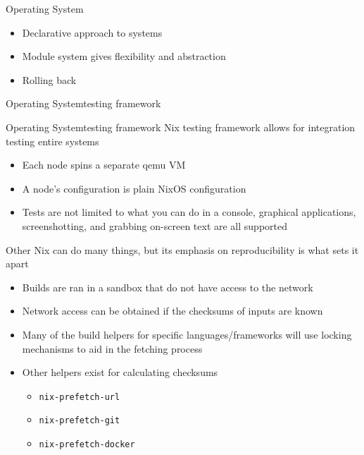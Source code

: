 \documentclass{beamer}
\begin{document}
\begin{frame}{Operating System}
	\begin{itemize}
		\item Declarative approach to systems
		\item Module system gives flexibility and abstraction
		\item Rolling back
	\end{itemize}
	
\end{frame}

\begin{frame}{Operating System}{testing framework}
	
\end{frame}

\begin{frame}{Operating System}{testing framework}
	Nix testing framework allows for integration testing entire systems
	\begin{itemize}
		\item Each node spins a separate qemu VM
		\item A node's configuration is plain NixOS configuration
		\item Tests are not limited to what you can do in a console, graphical
		      applications, screenshotting, and grabbing on-screen text are all
		      supported
	\end{itemize}
\end{frame}

\begin{frame}{Other}
	Nix can do many things, but its emphasis on reproducibility is what sets it
	apart
	\begin{itemize}
		\item Builds are ran in a sandbox that do not have access to the
		      network
		\item Network access can be obtained if the checksums of inputs are
		      known
		\item Many of the build helpers for specific languages/frameworks will
		      use locking mechanisms to aid in the fetching process
		\item Other helpers exist for calculating checksums
		      \begin{itemize}
			      \item \lstinline{nix-prefetch-url}
			      \item \lstinline{nix-prefetch-git}
			      \item \lstinline{nix-prefetch-docker}
		      \end{itemize}
	\end{itemize}
\end{frame}
\end{document}
